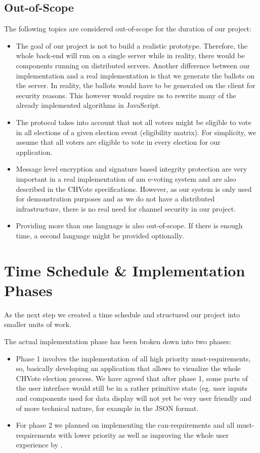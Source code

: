 \subsection{Out-of-Scope}
The following topics are considered out-of-scope for the duration of our project:
\begin{itemize}
	\item The goal of our project is not to build a realistic prototype. Therefore, the whole back-end will run on a single server while in reality, there would be components running on distributed servers. Another difference between our implementation and a real implementation is that we generate the ballots on the server. In reality, the ballots would have to be generated on the client for security reasons. This however would require us to rewrite many of the already implemented algorithms in JavaScript.
	\item The protocol takes into account that not all voters might be eligible to vote in all elections of a given election event (eligibility matrix). For simplicity, we assume that all voters are eligible to vote in every election for our application.
	\item Message level encryption and signature based integrity protection are very important in a real implementation of am e-voting system and are also described in the CHVote specifications. However, as our system is only used for demonstration purposes and as we do not have a distributed infrastructure, there is no real need for channel security in our project.
	\item Providing more than one language is also out-of-scope. If there is enough time, a second language might be provided optionally.
\end{itemize}

\section{Time Schedule \& Implementation Phases}
As the next step we created a time schedule and structured our project into smaller units of work.

The actual implementation phase has been broken down into two phases:

\begin{itemize}
	\item Phase 1 involves the implementation of all high priority must-requirements, so, basically developing an application that allows to visualize the whole CHVote election process. We have agreed that after phase 1, some parts of the user interface would still be in a rather primitive state (eg. user inputs and components used for data display will not yet be very user friendly and of more technical nature, for example in the JSON format.
	\item For phase 2 we planned on implementing the can-requirements and all must-requirements with lower priority as well as improving the whole user experience by .
\end{itemize}

